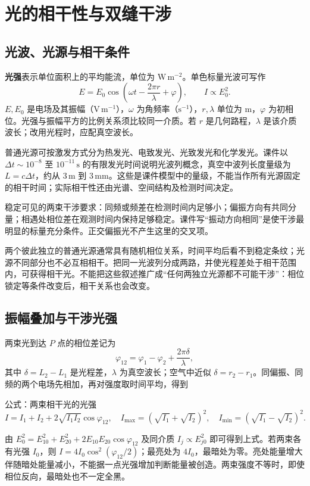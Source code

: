 \documentclass[UTF8,fontset=none,zihao=-4,a4paper]{ctexart}
\newcommand{\chapterpage}[1]{\clearpage\section{#1}}
\newcommand{\term}[1]{\textbf{#1}}
\newcommand{\unit}[1]{\,\mathrm{#1}}
\begin{document}
\chapterpage{光的相干性与双缝干涉}
\subsection{光波、光源与相干条件}
\term{光强}表示单位面积上的平均能流，单位为 $\mathrm{W\,m^{-2}}$。单色标量光波可写作
\[
 E=E_0\cos\left(\omega t-\frac{2\pi r}{\lambda}+\varphi\right),
 \qquad I\propto E_0^2.
\]
$E,E_0$ 是电场及其振幅（$\mathrm{V\,m^{-1}}$），$\omega$ 为角频率（$\mathrm{s^{-1}}$），$r,\lambda$ 单位为 m，$\varphi$ 为初相位。光强与振幅平方的比例关系须比较同一介质。若 $r$ 是几何路程，$\lambda$ 是该介质波长；改用光程时，应配真空波长。

普通光源可按激发方式分为热发光、电致发光、光致发光和化学发光。课件以 $\Delta t\sim10^{-8}$ 至 $10^{-11}\unit s$ 的有限发光时间说明光波列概念，真空中波列长度量级为 $L=c\Delta t$，约从 $3\unit m$ 到 $3\unit{mm}$。这些是课件模型中的量级，不能当作所有光源固定的相干时间；实际相干性还由光谱、空间结构及检测时间决定。

稳定可见的两束干涉要求：同频或频差在检测时间内足够小；偏振方向有共同分量；相遇处相位差在观测时间内保持足够稳定。课件写“振动方向相同”是使干涉最明显的标量充分条件。正交偏振光不产生这里的交叉项。

两个彼此独立的普通光源通常具有随机相位关系，时间平均后看不到稳定条纹；光源不同部分也不必互相相干。把同一光波列分成两路，并使光程差处于相干范围内，可获得相干光。不能把这些叙述推广成“任何两独立光源都不可能干涉”：相位锁定等条件改变后，相干关系也会改变。

\subsection{振幅叠加与干涉光强}
两束光到达 $P$ 点的相位差记为
\[
 \varphi_{12}=\varphi_1-\varphi_2+\frac{2\pi\delta}{\lambda},
\]
其中 $\delta=L_2-L_1$ 是光程差，$\lambda$ 为真空波长；空气中近似 $\delta=r_2-r_1$。同偏振、同频的两个电场先相加，再对强度取时间平均，得到
\begin{infobox}{公式：两束相干光的光强}
\[
 I=I_1+I_2+2\sqrt{I_1I_2}\cos\varphi_{12},
 \quad I_{\max}=(\sqrt{I_1}+\sqrt{I_2})^2,
 \quad I_{\min}=(\sqrt{I_1}-\sqrt{I_2})^2.
\]
\end{infobox}
由 $E_0^2=E_{10}^2+E_{20}^2+2E_{10}E_{20}\cos\varphi_{12}$ 及同介质 $I_j\propto E_{j0}^2$ 即可得到上式。若两束各有光强 $I_0$，则 $I=4I_0\cos^2(\varphi_{12}/2)$；最亮处为 $4I_0$，最暗处为零。亮处能量增大伴随暗处能量减小，不能据一点光强增加判断能量被创造。两束强度不等时，即使相位反向，最暗处也不一定全黑。
\end{document}
